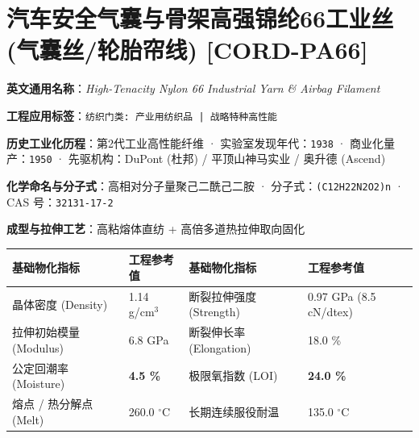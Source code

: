 \documentclass[11pt,openright,twoside,UTF8]{ctexbook}
\begin{document}
\section{汽车安全气囊与骨架高强锦纶66工业丝 (气囊丝/轮胎帘线) [CORD-PA66]}
\label{sec:cord-pa66}

\noindent\textbf{英文通用名称}：\textit{High-Tenacity Nylon 66 Industrial Yarn \& Airbag Filament}\par
\noindent\textbf{工程应用标签}：\texttt{纺织门类: 产业用纺织品 | 战略特种高性能}\par
\noindent\textbf{历史工业化历程}：第2代工业高性能纤维 · 实验室发现年代：\texttt{1938} · 商业化量产：\texttt{1950} · 先驱机构：DuPont (杜邦) / 平顶山神马实业 / 奥升德 (Ascend)\par
\noindent\textbf{化学命名与分子式}：高相对分子量聚己二酰己二胺 · 分子式：\texttt{(C12H22N2O2)n} · CAS 号：\texttt{32131-17-2}\par
\noindent\textbf{成型与拉伸工艺}：高粘熔体直纺 + 高倍多道热拉伸取向固化\par

\vspace{0.15cm}
\begin{center}
\small
\begin{tabularx}{\textwidth}{p{3.8cm}Xp{3.8cm}X}
\toprule
\textbf{基础物化指标} & \textbf{工程参考值} & \textbf{基础物化指标} & \textbf{工程参考值} \\
\midrule
晶体密度 (Density) & 1.14 g/cm$^3$ & 断裂拉伸强度 (Strength) & 0.97 GPa (8.5 cN/dtex) \\
拉伸初始模量 (Modulus) & 6.8 GPa & 断裂伸长率 (Elongation) & 18.0 \% \\
公定回潮率 (Moisture) & \textbf{4.5 \%} & 极限氧指数 (LOI) & \textbf{24.0 \%} \\
熔点 / 热分解点 (Melt) & 260.0 $^\circ\mathrm{C}$ & 长期连续服役耐温 & 135.0 $^\circ\mathrm{C}$ \\
\bottomrule
\end{tabularx}
\end{center}
\vspace{0.15cm}
\end{document}
